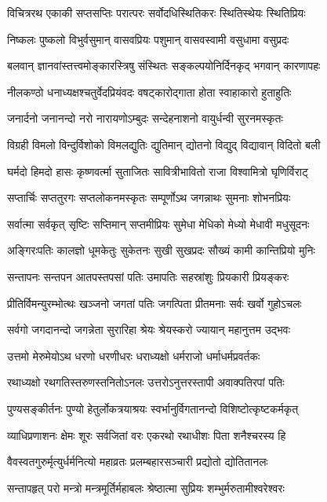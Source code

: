 \twolineshloka
{विचित्ररथ एकाकी सप्तसप्तिः परात्परः}
{सर्वोदधिस्थितिकरः स्थितिस्थेयः स्थितिप्रियः}%

\twolineshloka
{निष्कलः पुष्कलो विभुर्वसुमान् वासवप्रियः}
{पशुमान् वासवस्वामी वसुधामा वसुप्रदः}%

\twolineshloka
{बलवान् ज्ञानवांस्तत्त्वमोङ्कारस्त्रिषु संस्थितः}
{सङ्कल्पयोनिर्दिनकृद् भगवान् कारणापहः}%

\twolineshloka
{नीलकण्ठो धनाध्यक्षश्चतुर्वेदप्रियंवदः}
{वषट्कारोद्गाता होता स्वाहाकारो हुताहुतिः}%

\twolineshloka
{जनार्दनो जनानन्दो नरो नारायणोऽम्बुदः}
{सन्देहनाशनो वायुर्धन्वी सुरनमस्कृतः}%

\twolineshloka
{विग्रही विमलो विन्दुर्विशोको विमलद्युतिः}
{द्युतिमान् द्योतनो विद्युद् विद्यावान् विदितो बली}%

\twolineshloka
{घर्मदो हिमदो हासः कृष्णवर्त्मा सुताजितः}
{सावित्रीभावितो राजा विश्वामित्रो घृणिर्विराट्}%

\twolineshloka
{सप्तार्चिः सप्ततुरगः सप्तलोकनमस्कृतः}
{सम्पूर्णोऽथ जगन्नाथः सुमनाः शोभनप्रियः}%

\twolineshloka
{सर्वात्मा सर्वकृत् सृष्टिः सप्तिमान् सप्तमीप्रियः}
{सुमेधा मेधिको मेध्यो मेधावी मधुसूदनः}%

\twolineshloka
{अङ्गिरःपतिः कालज्ञो धूमकेतुः सुकेतनः}
{सुखी सुखप्रदः सौख्यं कामी कान्तिप्रियो मुनिः}%

\twolineshloka
{सन्तापनः सन्तपन आतपस्तपसां पतिः}
{उमापतिः सहस्रांशुः प्रियकारी प्रियङ्करः}%

\twolineshloka
{प्रीतिर्विमन्युरम्भोत्थः खञ्जनो जगतां पतिः}
{जगत्पिता प्रीतमनाः सर्वः खर्वो गुहोऽचलः}%

\twolineshloka
{सर्वगो जगदानन्दो जगन्नेता सुरारिहा}
{श्रेयः श्रेयस्करो ज्यायान् महानुत्तम उद्भवः}%

\twolineshloka
{उत्तमो मेरुमेयोऽथ धरणो धरणीधरः}
{धराध्यक्षो धर्मराजो धर्माधर्मप्रवर्तकः}%

\twolineshloka
{रथाध्यक्षो रथगतिस्तरुणस्तनितोऽनलः}
{उत्तरोऽनुत्तरस्तापी अवाक्पतिरपां पतिः}%

\twolineshloka
{पुण्यसङ्कीर्तनः पुण्यो हेतुर्लोकत्रयाश्रयः}
{स्वर्भानुर्विगतानन्दो विशिष्टोत्कृष्टकर्मकृत्}%

\twolineshloka
{व्याधिप्रणाशनः क्षेमः शूरः सर्वजितां वरः}
{एकरथो रथाधीशः पिता शनैश्चरस्य हि}%

\twolineshloka
{वैवस्वतगुरुर्मृत्युर्धर्मनित्यो महाव्रतः}
{प्रलम्बहारसञ्चारी प्रद्योतो द्योतितानलः}%

\twolineshloka
{सन्तापहृत् परो मन्त्रो मन्त्रमूर्तिर्महाबलः}
{श्रेष्ठात्मा सुप्रियः शम्भुर्मरुतामीश्वरेश्वरः}%

